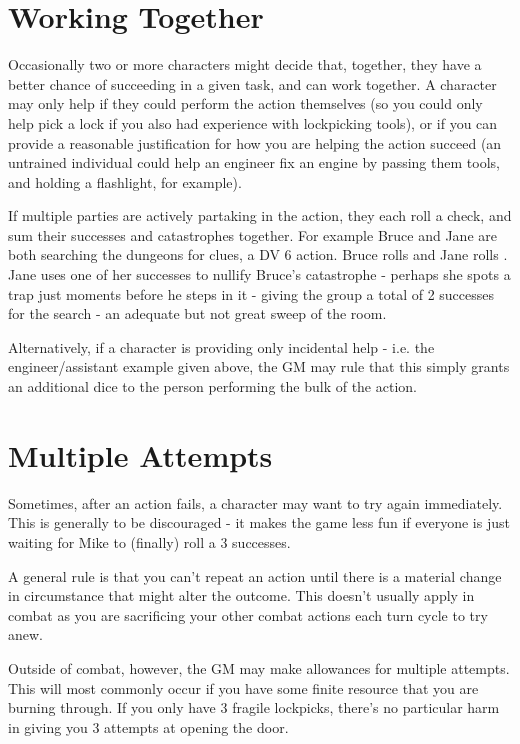 \section{Working Together}

Occasionally two or more characters might decide that, together, they have a better chance of succeeding in a given task, and can work together. A character may only help if they could perform the action themselves (so you could only help pick a lock if you also had experience with lockpicking tools), or if you can provide a reasonable justification for how you are helping the action succeed (an untrained individual could help an engineer fix an engine by passing them tools, and holding a flashlight, for example). 

If multiple parties are actively partaking in the action, they each roll a check, and sum their successes and catastrophes together. For example Bruce and Jane are both searching the dungeons for clues, a DV 6 action. Bruce rolls  and Jane rolls . Jane uses one of her successes to nullify Bruce's catastrophe - perhaps she spots a trap just moments before he steps in it - giving the group a total of 2 successes for the search - an adequate but not great sweep of the room. 

Alternatively, if a character is providing only incidental help - i.e. the engineer/assistant example given above, the GM may rule that this simply grants an additional dice to the person performing the bulk of the action.


\section{Multiple Attempts}

Sometimes, after an action fails, a character may want to try again immediately. This is generally to be discouraged - it makes the game less fun if everyone is just waiting for Mike to (finally) roll a 3 successes. 

A general rule is that you can't repeat an action until there is a material change in circumstance that might alter the outcome. This doesn't usually apply in combat as you are sacrificing your other combat actions each turn cycle to try anew. 

Outside of combat, however, the GM may make allowances for multiple attempts. This will most commonly occur if you have some finite resource that you are burning through. If you only have 3 fragile lockpicks, there's no particular harm in giving you 3 attempts at opening the door. 

